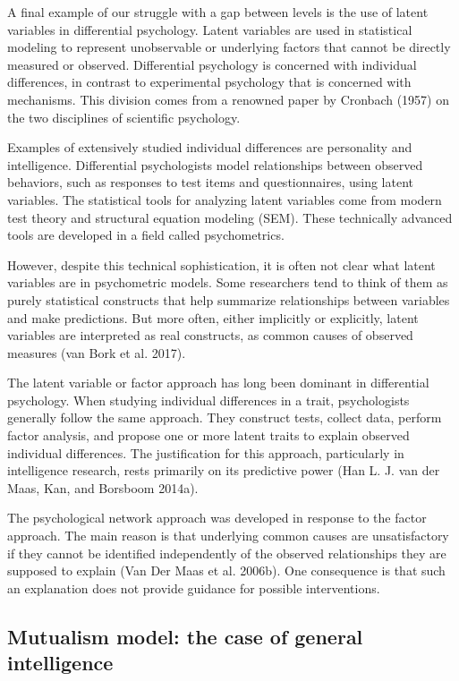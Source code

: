 \documentclass[
  a4paper,
  DIV=11,
  numbers=noendperiod,
  oneside]{scrreprt}
\begin{document}
A final example of our struggle with a gap between levels is the use of
latent variables in differential psychology. Latent variables are used
in statistical modeling to represent unobservable or underlying factors
that cannot be directly measured or observed. Differential psychology is
concerned with individual differences, in contrast to experimental
psychology that is concerned with mechanisms. This division comes from a
renowned paper by Cronbach (1957) on the two disciplines of scientific
psychology.

Examples of extensively studied individual differences are personality
and intelligence. Differential psychologists model relationships between
observed behaviors, such as responses to test items and questionnaires,
using latent variables. The statistical tools for analyzing latent
variables come from modern test theory and structural equation modeling
(SEM). These technically advanced tools are developed in a field called
psychometrics.

However, despite this technical sophistication, it is often not clear
what latent variables are in psychometric models. Some researchers tend
to think of them as purely statistical constructs that help summarize
relationships between variables and make predictions. But more often,
either implicitly or explicitly, latent variables are interpreted as
real constructs, as common causes of observed measures (van Bork et al.
2017).

The latent variable or factor approach has long been dominant in
differential psychology. When studying individual differences in a
trait, psychologists generally follow the same approach. They construct
tests, collect data, perform factor analysis, and propose one or more
latent traits to explain observed individual differences. The
justification for this approach, particularly in intelligence research,
rests primarily on its predictive power (Han L. J. van der Maas, Kan,
and Borsboom 2014a).

The psychological network approach was developed in response to the
factor approach. The main reason is that underlying common causes are
unsatisfactory if they cannot be identified independently of the
observed relationships they are supposed to explain (Van Der Maas et al.
2006b). One consequence is that such an explanation does not provide
guidance for possible interventions.

\hypertarget{sec-Mutualism-model-the-case-of-general-intelligence}{%
\subsection{Mutualism model: the case of general
intelligence}\label{sec-Mutualism-model-the-case-of-general-intelligence}}
\end{document}
